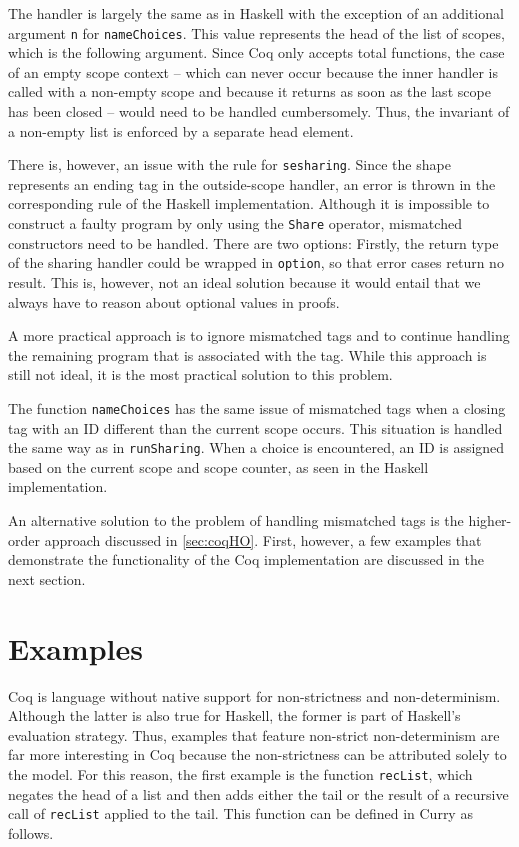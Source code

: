 \documentclass[a4paper, 11pt, fleqn, twoside, abstract=on]{scrreprt}
\newcommand{\hinl}[1]{\texttt{#1}}
\newcommand{\cinl}[1]{\texttt{#1}}
\begin{document}
The handler is largely the same as in Haskell with the exception of an additional argument \cinl{n} for \cinl{nameChoices}.
This value represents the head of the list of scopes, which is the following argument.
Since Coq only accepts total functions, the case of an empty scope context -- which can never occur because the inner handler is called with a non-empty scope and because it returns as soon as the last scope has been closed -- would need to be handled cumbersomely.
Thus, the invariant of a non-empty list is enforced by a separate head element.

There is, however, an issue with the rule for \cinl{sesharing}.
Since the shape represents an ending tag in the outside-scope handler, an error is thrown in the corresponding rule of the Haskell implementation.
Although it is impossible to construct a faulty program by only using the \cinl{Share} operator, mismatched constructors need to be handled.
There are two options: Firstly, the return type of the sharing handler could be wrapped in \cinl{option}, so that error cases return no result.
This is, however, not an ideal solution because it would entail that we always have to reason about optional values in proofs.

A more practical approach is to ignore mismatched tags and to continue handling the remaining program that is associated with the tag.
While this approach is still not ideal, it is the most practical solution to this problem.

The function \cinl{nameChoices} has the same issue of mismatched tags when a closing tag with an ID different than the current scope occurs.
This situation is handled the same way as in \cinl{runSharing}.
When a choice is encountered, an ID is assigned based on the current scope and scope counter, as seen in the Haskell implementation.

An alternative solution to the problem of handling mismatched tags is the higher-order approach discussed in \autoref{sec:coqHO}.
First, however, a few examples that demonstrate the functionality of the Coq implementation are discussed in the next section.

\section{Examples}
Coq is language without native support for non-strictness and non-determinism.
Although the latter is also true for Haskell, the former is part of Haskell's evaluation strategy.
Thus, examples that feature non-strict non-determinism are far more interesting in Coq because the non-strictness can be attributed solely to the model.
For this reason, the first example is the function \hinl{recList}, which negates the head of a list and then adds either the tail or the result of a recursive call of \hinl{recList} applied to the tail.
This function can be defined in Curry as follows. 
\end{document}

